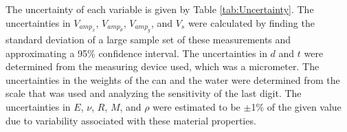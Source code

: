 \documentclass[10pt,journal,letterpaper]{IEEEtran}
\begin{document}
The uncertainty of each variable is given by Table \ref{tab:Uncertainty}.
The uncertainties in $V_{amp_{x}}$, $V_{amp_{\theta}}$, $V_{amp_{y}}$, and $V_{s}$ were calculated by finding the standard deviation of a large sample set of these measurements and approximating a 95\% confidence interval.
The uncertainties in $d$ and $t$ were determined from the measuring device used, which was a micrometer.
The uncertainties in the weights of the can and the water were determined from the scale that was used and analyzing the sensitivity of the last digit.
The uncertainties in $E$, $\nu$, $R$, $M$, and $\rho$ were estimated to be $\pm$1\% of the given value due to variability associated with these material properties.
\begin{table}[H]
\renewcommand\arraystretch{1.25}
\centering
\caption{Uncertainty in Each Variable}
\end{table}
\end{document}
